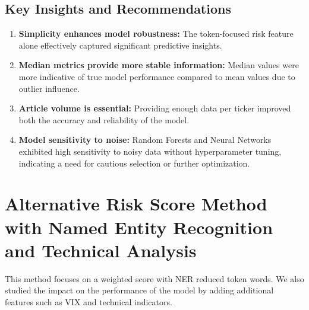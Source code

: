 \documentclass[twocolumn]{article}
\begin{document}
\subsection{Key Insights and Recommendations}

\begin{enumerate}
    \item \textbf{Simplicity enhances model robustness:} The token-focused risk feature alone effectively captured significant predictive insights.
    \item \textbf{Median metrics provide more stable information:} Median values were more indicative of true model performance compared to mean values due to outlier influence.
    \item \textbf{Article volume is essential:} Providing enough data per ticker improved both the accuracy and reliability of the model.
    \item \textbf{Model sensitivity to noise:} Random Forests and Neural Networks exhibited high sensitivity to noisy data without hyperparameter tuning, indicating a need for cautious selection or further optimization.
\end{enumerate}


\section{Alternative Risk Score Method with Named Entity Recognition and Technical Analysis}
This method focuses on a weighted score with NER reduced token words. We also studied the impact on the performance of the model by adding additional features such as VIX and technical indicators.
\end{document}

